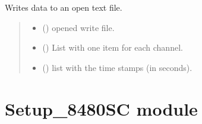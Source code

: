 \documentclass[letterpaper,10pt,english]{sphinxmanual}
\begin{document}
\begin{fulllineitems}
\begin{fulllineitems}
\label{\detokenize{Setup_8401HR:Setup_8401HR.Setup_8401HR._WriteDataToFile_TXT}}
\pysigstartsignatures
{}
\pysigstopsignatures
\sphinxAtStartPar
Writes data to an open text file.
\begin{quote}\begin{description}
\begin{itemize}
\item {} 
\sphinxAtStartPar
{} () \textendash{} opened write file.

\item {} 
\sphinxAtStartPar
{} (\sphinxstyleliteralemphasis{\sphinxupquote{{[}}}\sphinxstyleliteralemphasis{\sphinxupquote{{]}}}) \textendash{} List with one item for each channel.

\item {} 
\sphinxAtStartPar
{} () \textendash{} list with the time stamps (in seconds).

\end{itemize}

\end{description}\end{quote}

\end{fulllineitems}


\end{fulllineitems}


\sphinxstepscope


\section{Setup\_8480SC module}
\label{\detokenize{Setup_8480SC:module-Setup_8480SC}}\label{\detokenize{Setup_8480SC:setup-8480sc-module}}\label{\detokenize{Setup_8480SC::doc}}
\end{document}
